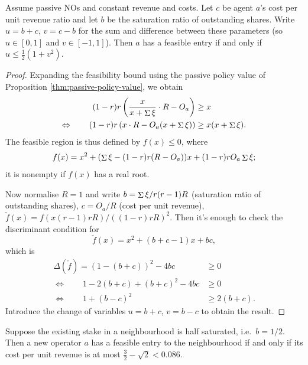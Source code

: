 \begin{proposition}
  \label{thm:feasible-entry}

  Assume passive NOs and constant revenue and costs.
  Let $c$ be agent $a$'s cost per unit revenue ratio and let $b$ be the saturation ratio of outstanding shares.
  Write $u=b+c$, $v=c - b$ for the sum and difference between these parameters (so $u\in[0,1]$ and $v\in[-1,1]$).
  Then $a$ has a feasible entry if and only if $u \leq \frac{1}{2}(1+v^2)$.

\end{proposition}
%
\begin{proof}

  Expanding the feasibility bound using the passive policy value of Proposition \ref{thm:passive-policy-value}, we obtain
  \begin{align*}
    (1-r)r\left(\frac{x}{x+\mathop{\Sigma}{\xi}} \cdot R - O_a \right) &\geq  x \\
    \Leftrightarrow \qquad (1-r)r\left(x \cdot R - O_a (x+\mathop{\Sigma}\xi) \right) &\geq x(x+\mathop{\Sigma}\xi) .
  \end{align*}
  The feasible region is thus defined by $f(x)\leq 0$, where
  \[
    f(x) = x^2 + (\mathop{\Sigma}\xi - (1-r)r(R-O_a))x + (1-r)rO_a\mathop{\Sigma}\xi;
  \]
  it is nonempty if $f(x)$ has a real root.

  Now normalise $R=1$ and write $b=\mathop{\Sigma}\xi/r(r-1)R$ (saturation ratio of outstanding shares), $c=O_a/R$ (cost per unit revenue), $\check{f}(x)=f(x(r-1)rR)/((1-r)rR)^2$.
  Then it's enough to check the discriminant condition for
  \[
    \check{f}(x) = x^2 + (b + c - 1)x + bc,
  \]
  which is
  \begin{align*}
    \Delta(\check{f}) = (1 - (b+c) )^2 - 4bc &\geq 0 \\
    \Leftrightarrow\qquad 1 - 2(b+c) + (b+c)^2 - 4bc &\geq 0 \\
    \Leftrightarrow\qquad 1 + (b-c)^2 &\geq 2(b+c).
  \end{align*}
  Introduce the change of variables $u=b+c$, $v=b-c$ to obtain the result.\qedhere

\end{proof}

\begin{example}

  Suppose the existing stake in a neighbourhood is half saturated, i.e.~$b=1/2$.
  Then a new operator $a$ has a feasible entry to the neighbourhood if and only if its cost per unit revenue is at most $\frac{3}{2}-\sqrt{2}< 0.086$.

\end{example}

